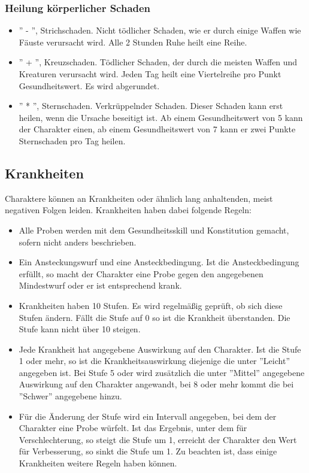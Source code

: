 \documentclass{article}
\begin{document}
\subsubsection{Heilung körperlicher Schaden}

\begin{itemize}
\item '' - '', Strichschaden. Nicht tödlicher Schaden, wie er durch einige Waffen wie Fäuste verursacht wird. Alle 2 Stunden Ruhe heilt eine Reihe.
\item '' + '', Kreuzschaden. Tödlicher Schaden, der durch die meisten Waffen und Kreaturen verursacht wird. Jeden Tag heilt eine Viertelreihe pro Punkt Gesundheitswert. Es wird abgerundet.
\item '' * '', Sternschaden. Verkrüppelnder Schaden. Dieser Schaden kann erst heilen, wenn die Ursache beseitigt ist. Ab einem Gesundheitswert von 5 kann der Charakter einen, ab einem Gesundheitswert von 7 kann er zwei Punkte Sternschaden pro Tag heilen.
\end{itemize}

\begin{center}
\subsection{Krankheiten}
\end{center}

Charaktere können an Krankheiten oder ähnlich lang anhaltenden, meist negativen Folgen leiden. Krankheiten haben
dabei folgende Regeln:

\begin{itemize}
\item Alle Proben werden mit dem Gesundheitsskill und Konstitution gemacht, sofern nicht anders beschrieben.
\item Ein Ansteckungswurf und eine Ansteckbedingung. Ist die Ansteckbedingung erfüllt, so macht der Charakter eine Probe gegen den angegebenen Mindestwurf oder er ist entsprechend krank.
\item Krankheiten haben 10 Stufen. Es wird regelmäßig geprüft, ob sich diese Stufen ändern. Fällt die Stufe auf 0 so ist die Krankheit überstanden. Die Stufe kann nicht über 10 steigen.
\item Jede Krankheit hat angegebene Auswirkung auf den Charakter. Ist die Stufe 1 oder mehr, so ist die Krankheitsauswirkung diejenige die unter ''Leicht'' angegeben ist. Bei Stufe 5 oder wird zusätzlich die unter ''Mittel'' angegebene Auswirkung auf den Charakter angewandt, bei 8 oder mehr kommt die bei ''Schwer'' angegebene hinzu.
\item Für die Änderung der Stufe wird ein Intervall angegeben, bei dem der Charakter eine Probe würfelt. Ist das Ergebnis, unter dem für Verschlechterung, so steigt die Stufe um 1, erreicht der Charakter den Wert für Verbesserung, so sinkt die Stufe um 1. Zu beachten ist, dass einige Krankheiten weitere Regeln haben können.
\end{itemize}
\end{document}
